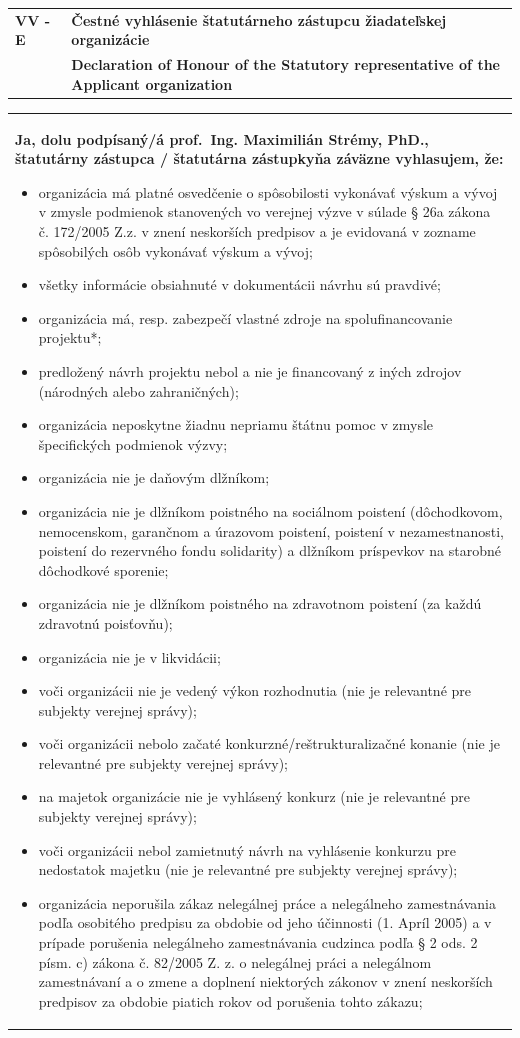 \documentclass[9pt,a4paper]{extarticle}
\newcommand{\SecHead}[3]{\par\needspace{45pt}\vspace{7pt}\noindent
\begin{tabularx}{\textwidth}{|>{\bfseries\centering\arraybackslash}p{18mm}|X|}
\hline\cellcolor{shade}#1 & \cellcolor{shade}\hfill\bfseries #2 \\ \cellcolor{shade} & \cellcolor{shade}\hfill\bfseries #3 \\ \hline
\end{tabularx}\vspace{3pt}\par}
\begin{document}
\SecHead{VV - E}{Čestné vyhlásenie štatutárneho zástupcu žiadateľskej organizácie}{Declaration of Honour of the Statutory representative of the Applicant organization}
\noindent\begin{tabularx}{\textwidth}{|X|}\hline
\textbf{Ja, dolu podpísaný/á prof.~Ing. Maximilián Strémy, PhD., štatutárny zástupca / štatutárna zástupkyňa záväzne vyhlasujem, že:}
\begin{itemize}[leftmargin=12mm,itemsep=0pt,parsep=0pt,topsep=2pt]
\item organizácia má platné osvedčenie o spôsobilosti vykonávať výskum a vývoj v zmysle podmienok stanovených vo verejnej výzve v súlade § 26a zákona č. 172/2005 Z.z. v znení neskorších predpisov a je evidovaná v zozname spôsobilých osôb vykonávať výskum a vývoj;
\item všetky informácie obsiahnuté v dokumentácii návrhu sú pravdivé;
\item organizácia má, resp. zabezpečí vlastné zdroje na spolufinancovanie projektu*;
\item predložený návrh projektu nebol a nie je financovaný z iných zdrojov (národných alebo zahraničných);
\item organizácia neposkytne žiadnu nepriamu štátnu pomoc v zmysle špecifických podmienok výzvy;
\item organizácia nie je daňovým dlžníkom;
\item organizácia nie je dlžníkom poistného na sociálnom poistení (dôchodkovom, nemocenskom, garančnom a úrazovom poistení, poistení v nezamestnanosti, poistení do rezervného fondu solidarity) a dlžníkom príspevkov na starobné dôchodkové sporenie;
\item organizácia nie je dlžníkom poistného na zdravotnom poistení (za každú zdravotnú poisťovňu);
\item organizácia nie je v likvidácii;
\item voči organizácii nie je vedený výkon rozhodnutia (nie je relevantné pre subjekty verejnej správy);
\item voči organizácii nebolo začaté konkurzné/reštrukturalizačné konanie (nie je relevantné pre subjekty verejnej správy);
\item na majetok organizácie nie je vyhlásený konkurz (nie je relevantné pre subjekty verejnej správy);
\item voči organizácii nebol zamietnutý návrh na vyhlásenie konkurzu pre nedostatok majetku (nie je relevantné pre subjekty verejnej správy);
\item organizácia neporušila zákaz nelegálnej práce a nelegálneho zamestnávania podľa osobitého predpisu za obdobie od jeho účinnosti (1. Apríl 2005) a v prípade porušenia nelegálneho zamestnávania cudzinca podľa § 2 ods. 2 písm. c) zákona č. 82/2005 Z. z. o nelegálnej práci a nelegálnom zamestnávaní a o zmene a doplnení niektorých zákonov v znení neskorších predpisov za obdobie piatich rokov od porušenia tohto zákazu;

\end{itemize}
\end{tabularx}
\end{document}
